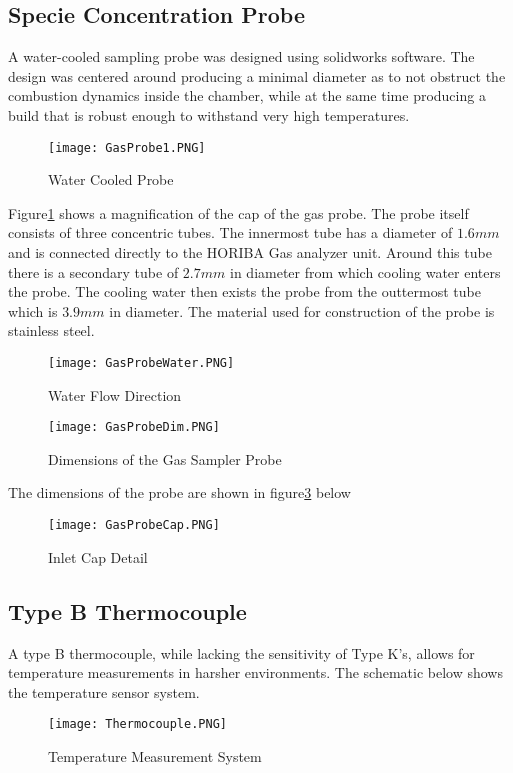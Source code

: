 \subsection{Specie Concentration Probe}
A water-cooled sampling probe was designed using solidworks software. The design was centered around producing a minimal diameter as to not obstruct the combustion dynamics inside the chamber, while at the same time producing a build that is robust enough to withstand very high temperatures.
 \begin{figure}[h!]
    \centering
        \texttt{[image: GasProbe1.PNG]}
        \caption{Water Cooled Probe}
    \label{f:GasProbe1}
\end{figure}
Figure\ref{f:GasProbe1} shows a magnification of the cap of the gas probe. The probe itself consists of three concentric tubes. The innermost tube has a diameter of  $1.6mm$ and is connected directly to the HORIBA Gas analyzer unit. Around this tube there is a secondary tube of $2.7mm$ in diameter from which cooling water enters the probe. The cooling water then exists the probe from the outtermost tube which is $3.9mm$ in diameter. The material used for construction of the probe is stainless steel.
 \begin{figure}[h!]
    \centering
        \texttt{[image: GasProbeWater.PNG]}
        \caption{Water Flow Direction}
    \label{f:GasProbeWater}
\end{figure}
\begin{figure}[h!]
    \centering
        \texttt{[image: GasProbeDim.PNG]}
        \caption{Dimensions of the Gas Sampler Probe}
    \label{f:GasProbeDim}
\end{figure}
The dimensions of the probe are shown in figure\ref{f:GasProbeDim} below
  \begin{figure}[h!]
    \centering
        \texttt{[image: GasProbeCap.PNG]}
        \caption{Inlet Cap Detail}
    \label{f:GasProbeCap}
\end{figure}
\subsection{Type B Thermocouple}
A type B thermocouple, while lacking the sensitivity of Type K's, allows for temperature measurements in harsher environments. The schematic below shows the temperature sensor system.
  \begin{figure}[h!]
    \centering
        \texttt{[image: Thermocouple.PNG]}
        \caption{Temperature Measurement System}
    \label{f:Thermocouple}
\end{figure}
